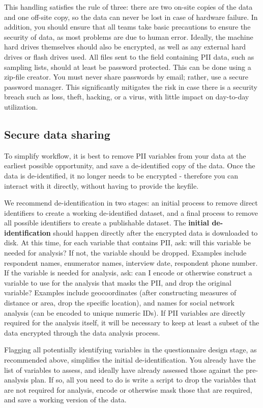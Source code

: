 This handling satisfies the rule of three: there are two on-site copies of the data and one off-site copy, so the data can never be lost in case of hardware failure.
In addition, you should ensure that all teams take basic precautions to ensure the security of data, as most problems are due to human error.
Ideally, the machine hard drives themselves should also be encrypted, as well as any external hard drives or flash drives used.
All files sent to the field containing PII data, such as sampling lists, should at least be password protected. This can be done using a zip-file creator.
You must never share passwords by email; rather, use a secure password manager.
This significantly mitigates the risk in case there is a security breach such as loss, theft, hacking, or a virus, with little impact on day-to-day utilization.

\subsection{Secure data sharing}
To simplify workflow, it is best to remove PII variables from your data at the earliest possible opportunity, and save a de-identified copy of the data.
Once the data is de-identified, it no longer needs to be encrypted - therefore you can interact with it directly, without having to provide the keyfile.

We recommend de-identification in two stages: an initial process to remove direct identifiers to create a working de-identified dataset, and a final process to remove all possible identifiers to create a publishable dataset.
The \textbf{initial de-identification} should happen directly after the encrypted data is downloaded to disk. At this time, for each variable that contains PII, ask: will this variable be needed for analysis?
If not, the variable should be dropped. Examples include respondent names, enumerator names, interview date, respondent phone number.
If the variable is needed for analysis, ask: can I encode or otherwise construct a variable to use for the analysis that masks the PII, and drop the original variable?
Examples include geocoordinates (after constructing measures of distance or area, drop the specific location), and names for social network analysis (can be encoded to unique numeric IDs).
If PII variables are directly required for the analysis itself, it will be necessary to keep at least a subset of the data encrypted through the data analysis process.

Flagging all potentially identifying variables in the questionnaire design stage, as recommended above, simplifies the initial de-identification.
You already have the list of variables to assess, and ideally have already assessed those against the pre-analysis plan.
If so, all you need to do is write a script to drop the variables that are not required for analysis, encode or otherwise mask those that are required, and save a working version of the data.

